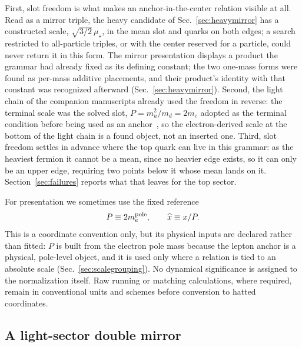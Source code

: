 \documentclass[aps,twocolumn,superscriptaddress,nofootinbib,floatfix]{revtex4-2}
\newcommand{\mstar}{\mu_\star}
\begin{document}
First, slot freedom is what makes an anchor-in-the-center relation visible at all. Read as a mirror triple, the heavy candidate of Sec.~\ref{sec:heavymirror} has a constructed scale, $\sqrt{3/2}\,\mstar$, in the mean slot and quarks on both edges; a search restricted to all-particle triples, or with the center reserved for a particle, could never return it in this form. The mirror presentation displays a product the grammar had already fixed as its defining constant; the two one-mass forms were found as per-mass additive placements, and their product's identity with that constant was recognized afterward (Sec.~\ref{sec:heavymirror}). Second, the light chain of the companion manuscripts already used the freedom in reverse: the terminal scale was the solved slot, $P=m_u^2/m_d=2m_e$ adopted as the terminal condition before being used as an anchor~\cite{BrilliantMPLA}, so the electron-derived scale at the bottom of the light chain is a found object, not an inserted one. Third, slot freedom settles in advance where the top quark can live in this grammar: as the heaviest fermion it cannot be a mean, since no heavier edge exists, so it can only be an upper edge, requiring two points below it whose mean lands on it. Section~\ref{sec:failures} reports what that leaves for the top sector.

For presentation we sometimes use the fixed reference
\begin{equation}
P\equiv2m_e^{\rm pole},
\qquad
\widehat x\equiv x/P.
\label{eq:pairnorm}
\end{equation}
This is a coordinate convention only, but its physical inputs are declared rather than fitted: $P$ is built from the electron pole mass because the lepton anchor is a physical, pole-level object, and it is used only where a relation is tied to an absolute scale (Sec.~\ref{sec:scalegrouping}). No dynamical significance is assigned to the normalization itself. Raw running or matching calculations, where required, remain in conventional units and schemes before conversion to hatted coordinates.

\subsection{A light-sector double mirror}
\label{sec:lightmirror}
\end{document}
